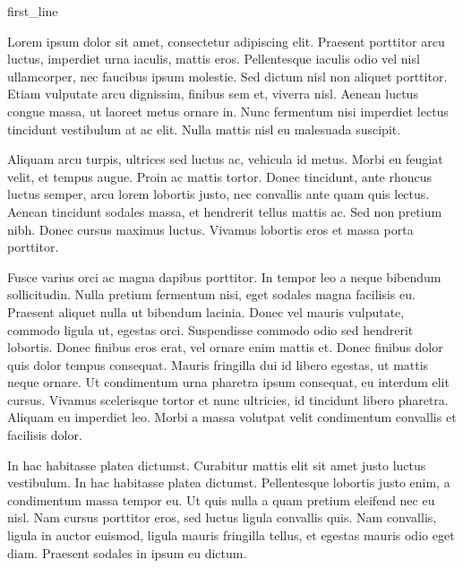 \documentclass[
	a4paper, %
	10pt, %
]{CSMinimalMemo}
\begin{document}
\outputheader %


{{first_line}}

Lorem ipsum dolor sit amet, consectetur adipiscing elit. Praesent porttitor arcu luctus, imperdiet urna iaculis, mattis eros. Pellentesque iaculis odio vel nisl ullamcorper, nec faucibus ipsum molestie. Sed dictum nisl non aliquet porttitor. Etiam vulputate arcu dignissim, finibus sem et, viverra nisl. Aenean luctus congue massa, ut laoreet metus ornare in. Nunc fermentum nisi imperdiet lectus tincidunt vestibulum at ac elit. Nulla mattis nisl eu malesuada suscipit.

Aliquam arcu turpis, ultrices sed luctus ac, vehicula id metus. Morbi eu feugiat velit, et tempus augue. Proin ac mattis tortor. Donec tincidunt, ante rhoncus luctus semper, arcu lorem lobortis justo, nec convallis ante quam quis lectus. Aenean tincidunt sodales massa, et hendrerit tellus mattis ac. Sed non pretium nibh. Donec cursus maximus luctus. Vivamus lobortis eros et massa porta porttitor.

Fusce varius orci ac magna dapibus porttitor. In tempor leo a neque bibendum sollicitudin. Nulla pretium fermentum nisi, eget sodales magna facilisis eu. Praesent aliquet nulla ut bibendum lacinia. Donec vel mauris vulputate, commodo ligula ut, egestas orci. Suspendisse commodo odio sed hendrerit lobortis. Donec finibus eros erat, vel ornare enim mattis et. Donec finibus dolor quis dolor tempus consequat. Mauris fringilla dui id libero egestas, ut mattis neque ornare. Ut condimentum urna pharetra ipsum consequat, eu interdum elit cursus. Vivamus scelerisque tortor et nunc ultricies, id tincidunt libero pharetra. Aliquam eu imperdiet leo. Morbi a massa volutpat velit condimentum convallis et facilisis dolor.

In hac habitasse platea dictumst. Curabitur mattis elit sit amet justo luctus vestibulum. In hac habitasse platea dictumst. Pellentesque lobortis justo enim, a condimentum massa tempor eu. Ut quis nulla a quam pretium eleifend nec eu nisl. Nam cursus porttitor eros, sed luctus ligula convallis quis. Nam convallis, ligula in auctor euismod, ligula mauris fringilla tellus, et egestas mauris odio eget diam. Praesent sodales in ipsum eu dictum.
\end{document}
